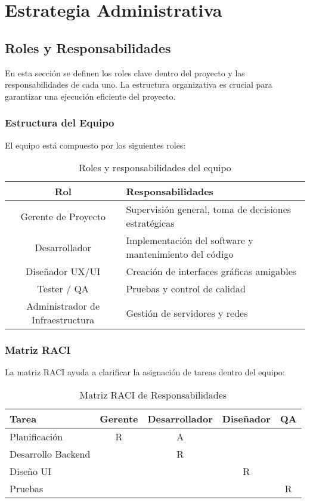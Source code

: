 \chapter{Estrategia Administrativa}

\section{Roles y Responsabilidades}

En esta sección se definen los roles clave dentro del proyecto y las responsabilidades de cada uno. La estructura organizativa es crucial para garantizar una ejecución eficiente del proyecto.

\subsection{Estructura del Equipo}
El equipo está compuesto por los siguientes roles:

\begin{table}[h]
	\centering
	\begin{tabular}{|c|l|}
		\hline
		\textbf{Rol} & \textbf{Responsabilidades} \\ \hline
		Gerente de Proyecto & Supervisión general, toma de decisiones estratégicas \\ \hline
		Desarrollador & Implementación del software y mantenimiento del código \\ \hline
		Diseñador UX/UI & Creación de interfaces gráficas amigables \\ \hline
		Tester / QA & Pruebas y control de calidad \\ \hline
		Administrador de Infraestructura & Gestión de servidores y redes \\ \hline
	\end{tabular}
	\caption{Roles y responsabilidades del equipo}
\end{table}

\subsection{Matriz RACI}
La matriz RACI ayuda a clarificar la asignación de tareas dentro del equipo:

\begin{table}[h]
	\centering
	\begin{tabular}{|l|c|c|c|c|}
		\hline
		\textbf{Tarea} & \textbf{Gerente} & \textbf{Desarrollador} & \textbf{Diseñador} & \textbf{QA} \\ \hline
		Planificación & R & A & & \\ \hline
		Desarrollo Backend & & R & & \\ \hline
		Diseño UI & & & R & \\ \hline
		Pruebas & & & & R \\ \hline
	\end{tabular}
	\caption{Matriz RACI de Responsabilidades}
\end{table}



